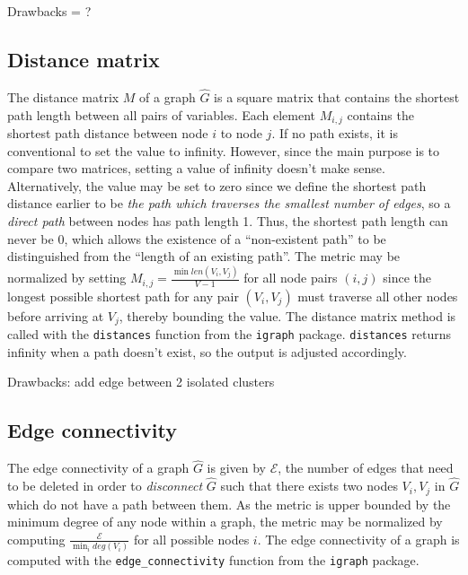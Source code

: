 Drawbacks = ?

\subsection{Distance matrix}

The distance matrix $M$ of a graph $\hat{G}$ is a square matrix that 
contains the shortest path length 
between all pairs of variables. Each element $M_{i,j}$ 
contains the shortest path distance between node $i$ to node $j$. If no path 
exists, it is conventional to set the value to infinity. However, since the 
main purpose is to compare two matrices, 
setting a value of infinity doesn't make sense. Alternatively, the value may be 
set to zero since we define the shortest path distance earlier to be 
\textit{the path which traverses the smallest number of edges}, so a 
\textit{direct path} between nodes has path length 1. Thus, the shortest path 
length can never be 0, which allows the existence of a ``non-existent path'' to 
be distinguished from the ``length of an existing path''. The metric may be 
normalized by setting $M_{i,j} = \frac{\min len(V_i,V_j)}{V-1}$ for all node 
pairs $(i,j)$ since the longest possible shortest path for any pair 
$(V_i,V_j)$ must traverse all other nodes before arriving at $V_j$, thereby 
bounding the value.
The distance matrix method is called with the \texttt{distances} function from 
the \texttt{igraph} package. \texttt{distances} returns infinity when a path 
doesn't exist, so the output is adjusted accordingly.

Drawbacks: add edge between 2 isolated clusters

\subsection{Edge connectivity}

The edge connectivity of a graph $\hat{G}$ is given by $\mathcal{E}$, the 
number of edges that need to be deleted in order to \textit{disconnect} 
$\hat{G}$ such that there exists two nodes $V_i,V_j$ in $\hat{G}$ which do not 
have a path between them.
As the metric is upper bounded by the minimum 
degree of any node within a graph, the metric may be normalized by computing 
$\frac{\mathcal{E}}{\min_i deg(V_i)}$ for all possible nodes $i$.
The edge connectivity of a graph is computed 
with the \texttt{edge\_connectivity} function from the \texttt{igraph} package. 

